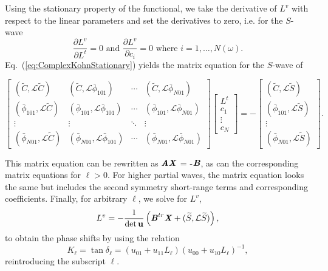 \documentclass[preprint,showpacs,showkeys,preprintnumbers,amsmath,amssymb,longbibliography,pra,aps]{revtex4-1}
\begin{document}
Using the stationary property of the functional, we take the derivative of
$L^v$ with respect to the linear parameters and set the derivatives to zero,
i.e. for the $S$-wave
\begin{equation}
\frac{\partial L^v}{\partial L^t} = 0  \text{ and }
  \frac{\partial L^v}{\partial c_i} = 0 \text{ where $i = 1,\ldots,N(\omega)$}.
\label{eq:ComplexKohnStationary}
\end{equation}
Eq.~(\ref{eq:ComplexKohnStationary}) yields the matrix equation for the $S$-wave of
\begin{widetext}
\begin{equation}
\label{eq:ComplexKohnMatrix}
\begin{bmatrix} 
 (\widetilde{C},\mathcal{L}\widetilde{C}) & (\widetilde{C},\mathcal{L}\bar{\phi}_{101}) & \cdots & (\widetilde{C},\mathcal{L}\bar{\phi}_{N01})\\
 (\bar{\phi}_{101},\mathcal{L}\widetilde{C}) & (\bar{\phi}_{101},\mathcal{L}\bar{\phi}_{101}) & \cdots & (\bar{\phi}_{101},\mathcal{L}\bar{\phi}_{N01})\\
 \vdots & \vdots & \ddots & \vdots \\
 (\bar{\phi}_{N01},\mathcal{L}\widetilde{C}) & (\bar{\phi}_{N01},\mathcal{L}\bar{\phi}_{101}) & \cdots & (\bar{\phi}_{N01},\mathcal{L}\bar{\phi}_{N01})
\end{bmatrix}
\begin{bmatrix}
L^t\\
c_1\\
\vdots\\
c_N
\end{bmatrix}
= -
\begin{bmatrix}
(\widetilde{C},\mathcal{L}\widetilde{S}) \\
(\bar{\phi}_{101},\mathcal{L}\widetilde{S}) \\
\vdots \\
(\bar{\phi}_{N01},\mathcal{L}\widetilde{S})
\end{bmatrix}.
\end{equation}
\end{widetext}
This matrix equation can be rewritten as
$\textbf{\emph{AX}}$ = -$\textbf{\emph{B}}$, as can the corresponding matrix
equations for $\ell > 0$. For higher partial waves,
the matrix equation looks the same but includes the second symmetry
short-range terms and corresponding coefficients. Finally, for arbitrary
$\ell$, we solve for $L^v$,
\begin{equation}
\label{eq:Lv}
L^v = -\frac{1}{\det \textbf{u}} \left( \textbf{\emph{B}}^{tr} \textbf{\emph{X}} +
  (\widetilde{S},\mathcal{L} \widetilde{S}) \right),
\end{equation}
to obtain the phase shifts by using the relation \cite{Lucchese1989}
\begin{equation}
\label{eq:GenKohnL}
K_\ell = \tan \delta_\ell = (u_{01} + u_{11} L_\ell)(u_{00} + u_{10}
  L_\ell)^{-1},
\end{equation}
reintroducing the subscript $\ell$.
\end{document}
